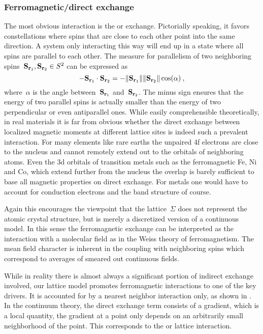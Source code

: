 \subsubsection{Ferromagnetic/direct exchange}

The most obvious interaction is the  or 
exchange. Pictorially speaking, it favors constellations where spins that are
close to each other point into the same direction. A system only interacting
this way will end up in a state where all spins are parallel to each other. The
measure for parallelism of two neighboring spins~$\mathbf{S}_{\mathbf{r}_1}, \mathbf{S}_{\mathbf{r}_2} \in S^2$
can be expressed as
%
\begin{equation}
  -\S_{\r_1} \cdot \S_{\r_2} =
  -\norm{\S_{\r_1}} \norm{\S_{\r_2}} \cos(\alpha) \:,
\end{equation}
%
where~$\alpha$ is the angle between~$\mathbf{S}_{\mathbf{r}_1}$ and~$\mathbf{S}_{\mathbf{r}_2}$. The minus sign
ensures that the energy of two parallel spins is actually smaller than the
energy of two perpendicular or even antiparallel ones. While easily
comprehensible theoretically, in real materials it is far from obvious whether
the direct exchange between localized magnetic moments at different lattice
sites is indeed such a prevalent interaction. For many elements like rare earths
the unpaired 4f electrons are close to the nucleus and cannot remotely extend
out to the orbitals of neighboring atoms. Even the 3d orbitals of transition
metals such as the ferromagnetic Fe, Ni and Co, which extend further from the
nucleus the overlap is barely sufficient to base all magnetic properties on
direct exchange. For metals one would have to account for conduction electrons
and the band structure of course.

Again this encourages the viewpoint that the lattice~$\Sigma$ does not represent
the atomic crystal structure, but is merely a discretized version of a
continuous model. In this sense the ferromagnetic exchange can be interpreted as
the interaction with a molecular field as in the Weiss theory of ferromagnetism.
The mean field character is inherent in the coupling with neighboring spins
which correspond to averages of smeared out continuous fields.

While in reality there is almost always a significant portion of indirect
exchange involved, our lattice model promotes ferromagnetic interactions to one
of the key drivers. It is accounted for by a nearest neighbor interaction only,
as shown in . In the continuum theory, the direct exchange
term consists of a gradient, which is a local quantity, \ie{} the gradient at a
point only depends on an arbitrarily small neighborhood of the point. This
corresponds to the  or  lattice
interaction.

